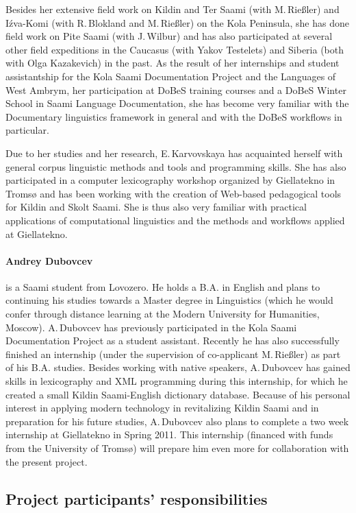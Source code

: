 \documentclass[a4paper,12pt]{article}
\begin{document}
{{Besides her extensive field work on Kildin and Ter Saami (with M.\,Rieß\-ler) and Iźva-Komi (with R.\,Blokland and M.\,Rießler) on the Kola Peninsula, she has done field work on Pite Saami (with J.\,Wilbur) and has also participated at several other field expeditions in the Caucasus (with Yakov Testelets) and Siberia (both with Olga Kazakevich) in the past. As the result of her internships and student assistantship for the Kola Saami Documentation Project and the Languages of West Ambrym, her participation at DoBeS training courses and a DoBeS Winter School in Saami Language Documentation, she has become very familiar with the Documentary linguistics framework in general and with the DoBeS workflows in particular.

Due to her studies and her research, E.\,Karvovskaya has acquainted herself with general corpus linguistic methods and tools and programming skills. She has also participated in a computer lexicography workshop organized by Giellatekno in Tromsø and has been working with the creation of Web-based pedagogical tools for Kildin and Skolt Saami. She is thus also very familiar with practical applications of computational linguistics and the methods and workflows applied at Giellatekno.

\paragraph{Andrey Dubovcev} is a Saami student from Lovozero. He holds a B.A. in English and plans to continuing his studies towards a Master degree in Linguistics (which he would confer through distance learning at the Modern University for Humanities, Moscow). A.\,Dubovcev has previously participated in the Kola Saami Documentation Project as a student assistant. Recently he has also successfully finished an internship (under the supervision of co-applicant M.\,Rießler) as part of his B.A. studies. Besides working with native speakers, A.\,Dubovcev has gained skills in lexicography and XML programming during this internship, for which he created a small Kildin Saami-English dictionary database. Because of his personal interest in applying modern technology in revitalizing Kildin Saami and in preparation for his future studies, A.\,Dubovcev also plans to complete a two week internship at Giellatekno in Spring 2011. This internship (financed with funds from the University of Tromsø) will prepare him even more for collaboration with the present project.

\subsection{Project participants' responsibilities}

}}
\end{document}
